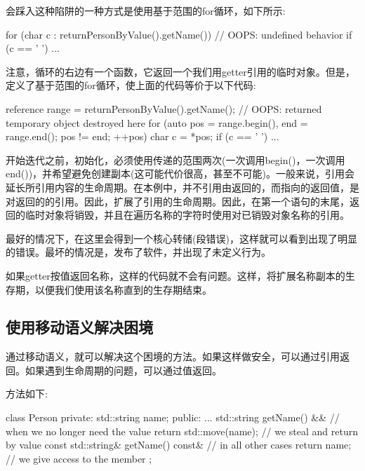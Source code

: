 会踩入这种陷阱的一种方式是使用基于范围的for循环，如下所示:

\begin{cppcode}
for (char c : returnPersonByValue().getName()) { // OOPS: undefined behavior
	if (c == ' ') {
		...
	}
}
\end{cppcode}

注意，循环的右边有一个函数，它返回一个我们用getter引用的临时对象。但是，定义了基于范围的for循环，使上面的代码等价于以下代码:

\begin{cppcode}
reference range = returnPersonByValue().getName();
// OOPS: returned temporary object destroyed here
for (auto pos = range.begin(), end = range.end(); pos != end; ++pos) {
	char c = *pos;
	if (c == ' ') {
		...
	}
}
\end{cppcode}

开始迭代之前，初始化，必须使用传递的范围两次(一次调用begin()，一次调用end())，并希望避免创建副本(这可能代价很高，甚至不可能)。一般来说，引用会延长所引用内容的生命周期。在本例中，并不引用由返回的，而指向的返回值，是对返回的的引用。因此，扩展了引用的生命周期。因此，在第一个语句的末尾，返回的临时对象将销毁，并且在遍历名称的字符时使用对已销毁对象名称的引用。

最好的情况下，在这里会得到一个核心转储(段错误)，这样就可以看到出现了明显的错误。最坏的情况是，发布了软件，并出现了未定义行为。

如果getter按值返回名称，这样的代码就不会有问题。这样，将扩展名称副本的生存期，以便我们使用该名称直到的生存期结束。

\subsection{使用移动语义解决困境}

通过移动语义，就可以解决这个困境的方法。如果这样做安全，可以通过引用返回。如果遇到生命周期的问题，可以通过值返回。

方法如下:

\begin{cppcode}
class Person
{
private:
	std::string name;
public:
	...
	std::string getName() && { // when we no longer need the value
		return std::move(name); // we steal and return by value
	}
	const std::string& getName() const& { // in all other cases
		return name; // we give access to the member
	}
};
\end{cppcode}


